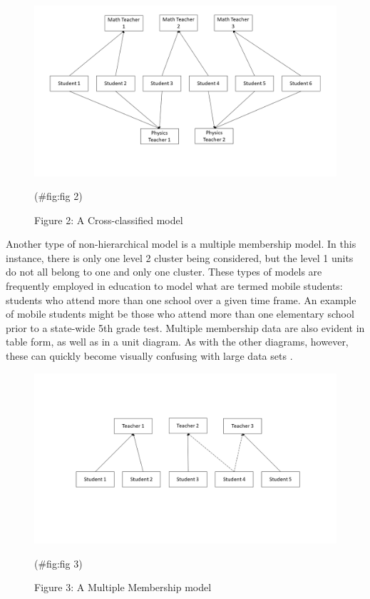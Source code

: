 \documentclass[
]{book}
\begin{document}
\begin{figure}
\includegraphics[width=17.78in]{Slide2} \caption{Figure 2: A Cross-classified model}(\#fig:fig 2)
\end{figure}

Another type of non-hierarchical model is a multiple membership model. In this instance, there is only one level 2 cluster being considered, but the level 1 units do not all belong to one and only one cluster. These types of models are frequently employed in education to model what are termed mobile students: students who attend more than one school over a given time frame. An example of mobile students might be those who attend more than one elementary school prior to a state-wide 5th grade test. Multiple membership data are also evident in table form, as well as in a unit diagram. As with the other diagrams, however, these can quickly become visually confusing with large data sets \citep[\citet{Beretvas}]{Leckie2013}.

\begin{figure}
\includegraphics[width=17.78in]{Slide3} \caption{Figure 3: A Multiple Membership model}(\#fig:fig 3)
\end{figure}
\end{document}
